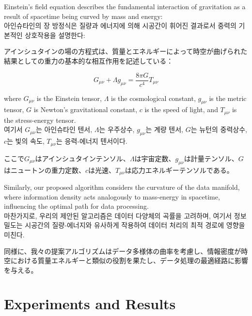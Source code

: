 \documentclass[12pt,a4paper]{article}
\begin{document}
Einstein's field equation describes the fundamental interaction of gravitation as a result of spacetime being curved by mass and energy: \\
아인슈타인의 장 방정식은 질량과 에너지에 의해 시공간이 휘어진 결과로서 중력의 기본적인 상호작용을 설명한다: \\
\begin{CJK}{UTF8}{min}
アインシュタインの場の方程式は、質量とエネルギーによって時空が曲げられた結果としての重力の基本的な相互作用を記述している：
\end{CJK}

\begin{equation}
G_{\mu\nu} + \Lambda g_{\mu\nu} = \frac{8\pi G}{c^4} T_{\mu\nu}
\end{equation}

where $G_{\mu\nu}$ is the Einstein tensor, $\Lambda$ is the cosmological constant, $g_{\mu\nu}$ is the metric tensor, $G$ is Newton's gravitational constant, $c$ is the speed of light, and $T_{\mu\nu}$ is the stress-energy tensor. \\
여기서 $G_{\mu\nu}$는 아인슈타인 텐서, $\Lambda$는 우주상수, $g_{\mu\nu}$는 계량 텐서, $G$는 뉴턴의 중력상수, $c$는 빛의 속도, $T_{\mu\nu}$는 응력-에너지 텐서이다. \\
\begin{CJK}{UTF8}{min}
ここで$G_{\mu\nu}$はアインシュタインテンソル、$\Lambda$は宇宙定数、$g_{\mu\nu}$は計量テンソル、$G$はニュートンの重力定数、$c$は光速、$T_{\mu\nu}$は応力エネルギーテンソルである。
\end{CJK}

Similarly, our proposed algorithm considers the curvature of the data manifold, where information density acts analogously to mass-energy in spacetime, influencing the optimal path for data processing. \\
마찬가지로, 우리의 제안된 알고리즘은 데이터 다양체의 곡률을 고려하며, 여기서 정보 밀도는 시공간의 질량-에너지와 유사하게 작용하여 데이터 처리의 최적 경로에 영향을 미친다. \\
\begin{CJK}{UTF8}{min}
同様に、我々の提案アルゴリズムはデータ多様体の曲率を考慮し、情報密度が時空における質量エネルギーと類似の役割を果たし、データ処理の最適経路に影響を与える。
\end{CJK}

\section{Experiments and Results}
\label{sec:experiments}
\end{document}
